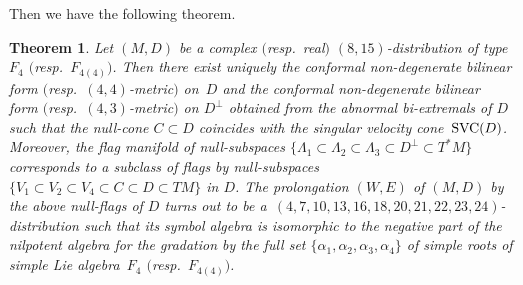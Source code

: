 \documentclass[11pt]{article}
\numberwithin{equation}{section}
\numberwithin{equation}{section}
\newtheorem{Theorem}{Theorem}[section]
\theoremstyle{definition}
\newcommand{\0}{\boldsymbol{0}}
\newcommand{\SVC}{{\mbox {\rm SVC}}}
\begin{document}
Then we have the following theorem.

\begin{Theorem}\label{Main-Theorem}
 Let $(M, D)$ be a complex $($resp.\ real$)$ $(8, 15)$-distribution of type $F_4$ $($resp.\ $F_{4(4)})$.
Then there exist uniquely the conformal non-degenerate bilinear form $($resp.\ $(4, 4)$-metric$)$ on~$D$ and the conformal non-degenerate bilinear form $($resp.\ $(4, 3)$-metric$)$ on $D^\perp$ obtained from the abnormal bi-extremals of $D$
such that the null-cone $C \subset D$ coincides with the singular velocity cone~$\SVC(D)$.
Moreover, the flag manifold of null-subspaces
${\bigl\{ \Lambda_1 \subset \Lambda_2 \subset \Lambda_3 \subset D^\perp \subset T^*M\bigr\}}$
corresponds to a subclass of flags by null-subspaces ${\{ V_1 \subset V_2 \subset V_4 \subset C \subset D \subset TM\}}$ in $D$. The prolongation $(W, E)$ of $(M, D)$ by the above null-flags of $D$
turns out to be a~$(4,7,10,13,16,18,20,\allowbreak 21,22,23,24)$-distribution such that its symbol algebra
is isomorphic to the negative part of the nilpotent algebra for the gradation by the full set
$\{\alpha_1, \alpha_2, \alpha_3, \alpha_4\}$ of simple roots
of simple Lie algebra~$F_4$ $($resp.\ $F_{4(4)})$.
\end{Theorem}
\end{document}

